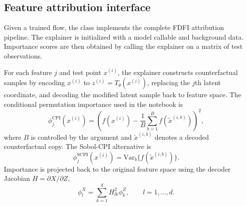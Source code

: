 \subsection{Feature attribution interface}

Given a trained flow, the  class implements the complete
FDFI attribution pipeline. The explainer is initialized with a model callable
and background data. Importance scores are then obtained by calling the
explainer on a matrix of test observations.

For each feature $j$ and test point $x^{(i)}$, the explainer constructs
counterfactual samples by encoding $x^{(i)}$ to
$z^{(i)} = T_\theta(x^{(i)})$, replacing the $j$th latent coordinate, and
decoding the modified latent sample back to feature space. The conditional
permutation importance used in the notebook is
%
\begin{equation} \label{eq:cpi}
\phi_j^{\mathrm{CPI}}(x^{(i)}) =
\left(
f(x^{(i)}) -
\frac{1}{B}\sum_{b=1}^{B} f(\tilde{x}^{(i,b)})
\right)^2,
\end{equation}
%
where $B$ is controlled by the argument  and
$\tilde{x}^{(i,b)}$ denotes a decoded counterfactual copy. The Sobol-CPI
alternative is
%
\begin{equation} \label{eq:scpi}
\phi_j^{\mathrm{SCPI}}(x^{(i)}) =
\mathrm{Var}_b\{f(\tilde{x}^{(i,b)})\}.
\end{equation}
%
Importance is projected back to the original feature space using the decoder
Jacobian $H = \partial X / \partial Z$,
%
\begin{equation} \label{eq:back-projection}
\phi_l^X = \sum_{k=1}^d H_{lk}^2 \phi_k^Z,
\qquad l = 1,\ldots,d.
\end{equation}

